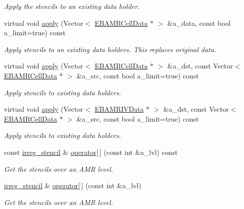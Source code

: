 \begin{DoxyCompactItemize}
\begin{DoxyCompactList}\small\item\em Apply the stencils to an existing data holder. \end{DoxyCompactList}\item 
virtual void \hyperlink{classirreg__amr__stencil_a2deacf98551d510c0c67d7735c094a52}{apply} (Vector$<$ \hyperlink{type__definitions_8H_a7e610f301989e5e07781c5e338bdb7c3}{E\+B\+A\+M\+R\+Cell\+Data} $\ast$ $>$ \&a\+\_\+data, const bool a\+\_\+limit=true) const 
\begin{DoxyCompactList}\small\item\em Apply stencils to an existing data holders. This replaces original data. \end{DoxyCompactList}\item 
virtual void \hyperlink{classirreg__amr__stencil_a0fcb42b86abd936794ba4f68654915c5}{apply} (Vector$<$ \hyperlink{type__definitions_8H_a7e610f301989e5e07781c5e338bdb7c3}{E\+B\+A\+M\+R\+Cell\+Data} $\ast$ $>$ \&a\+\_\+dst, const Vector$<$ \hyperlink{type__definitions_8H_a7e610f301989e5e07781c5e338bdb7c3}{E\+B\+A\+M\+R\+Cell\+Data} $\ast$ $>$ \&a\+\_\+src, const bool a\+\_\+limit=true) const 
\begin{DoxyCompactList}\small\item\em Apply stencils to existing data holders. \end{DoxyCompactList}\item 
virtual void \hyperlink{classirreg__amr__stencil_a79b1862b6f23dd0bf457d40d61854e51}{apply} (Vector$<$ \hyperlink{type__definitions_8H_a6b8fa905d55cbb491b52180386f0e0c1}{E\+B\+A\+M\+R\+I\+V\+Data} $\ast$ $>$ \&a\+\_\+dst, const Vector$<$ \hyperlink{type__definitions_8H_a7e610f301989e5e07781c5e338bdb7c3}{E\+B\+A\+M\+R\+Cell\+Data} $\ast$ $>$ \&a\+\_\+src, const bool a\+\_\+limit=true) const 
\begin{DoxyCompactList}\small\item\em Apply stencils to existing data holders. \end{DoxyCompactList}\item 
const \hyperlink{classirreg__stencil}{irreg\+\_\+stencil} \& \hyperlink{classirreg__amr__stencil_ac0fd06dcb4140b8a447acc2dec21566b}{operator\mbox{[}$\,$\mbox{]}} (const int \&a\+\_\+lvl) const 
\begin{DoxyCompactList}\small\item\em Get the stencils over an A\+MR level. \end{DoxyCompactList}\item 
\hyperlink{classirreg__stencil}{irreg\+\_\+stencil} \& \hyperlink{classirreg__amr__stencil_a565db0a16b0d17e849f7af7af7e23038}{operator\mbox{[}$\,$\mbox{]}} (const int \&a\+\_\+lvl)
\begin{DoxyCompactList}\small\item\em Get the stencils over an A\+MR level. \end{DoxyCompactList}\end{DoxyCompactItemize}
